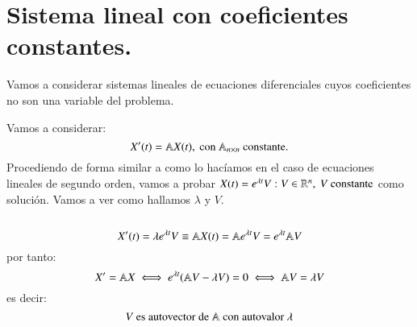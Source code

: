\section{Sistema lineal con coeficientes constantes.}

Vamos a considerar sistemas lineales de ecuaciones diferenciales cuyos coeficientes no son una variable del problema.

\begin{eg}
    Vamos a considerar:
    $$
        X'(t) = \mathbb{A} X(t),\text{ con } \mathbb{A}_{n\times n} \text{ constante.}
    $$
    Procediendo de forma similar a como lo hacíamos en el caso de ecuaciones lineales de segundo orden, vamos a probar $X(t) = e^{\lambda t} V : V\in\mathbb{R}^{n},\ V \text{ constante}$ como solución.
    Vamos a ver como hallamos $\lambda$ y $V$.\\\\
    $$
        X'(t) = \lambda e^{\lambda t} V \equiv \mathbb{A} X(t) = \mathbb{A} e^{\lambda t} V = e^{\lambda t} \mathbb{A} V
    $$
    por tanto:
    $$
        X' = \mathbb{A} X \iff e^{\lambda t}(\mathbb{A} V - \lambda V) = 0 \iff \mathbb{A} V = \lambda V
    $$
    es decir:
    $$
        V \text{ es autovector de } \mathbb{A} \text{ con autovalor } \lambda
    $$
\end{eg}

